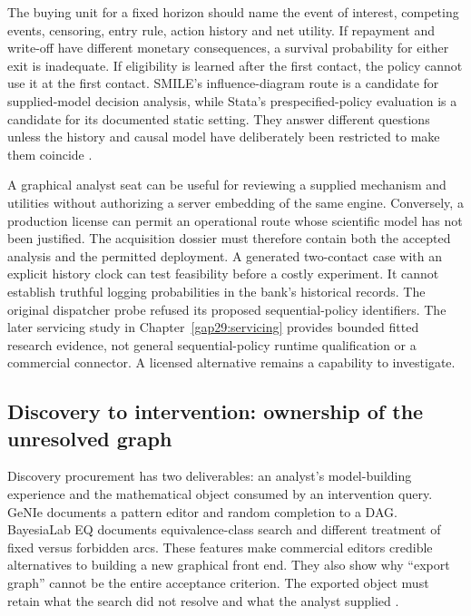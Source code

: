 The buying unit for a fixed horizon should name the event of interest, competing
events, censoring, entry rule, action history and net utility. If repayment and
write-off have different monetary consequences, a survival probability for
either exit is inadequate. If eligibility is learned after the first contact,
the policy cannot use it at the first contact. SMILE's influence-diagram route
is a candidate for supplied-model decision analysis, while Stata's
prespecified-policy evaluation is a candidate for its documented static
setting. They answer different questions unless the history and causal model
have deliberately been restricted to make them coincide
\citep{exec16_cp_bayesfusion,exec13_ch_stata}.

A graphical analyst seat can be useful for reviewing a supplied mechanism and
utilities without authorizing a server embedding of the same engine. Conversely,
a production license can permit an operational route whose scientific model
has not been justified. The acquisition dossier must therefore contain both
the accepted analysis and the permitted deployment. A generated two-contact
case with an explicit history clock can test feasibility before a costly
experiment. It cannot establish truthful logging probabilities in the bank's
historical records. The original dispatcher probe refused its proposed
sequential-policy identifiers. The later servicing study in
Chapter~\ref{gap29:servicing} provides bounded fitted research evidence, not
general sequential-policy runtime qualification or a commercial connector.
A licensed alternative remains a capability to investigate.

\subsection{Discovery to intervention: ownership of the unresolved graph}

Discovery procurement has two deliverables: an analyst's model-building
experience and the mathematical object consumed by an intervention query.
GeNIe documents a pattern editor and random completion to a DAG. BayesiaLab EQ
documents equivalence-class search and different treatment of fixed versus
forbidden arcs. These features make commercial editors credible alternatives
to building a new graphical front end. They also show why ``export graph''
cannot be the entire acceptance criterion. The exported object must retain
what the search did not resolve and what the analyst supplied
\citep{exec13_genie_pattern,exec13_bayesia_eq}.

